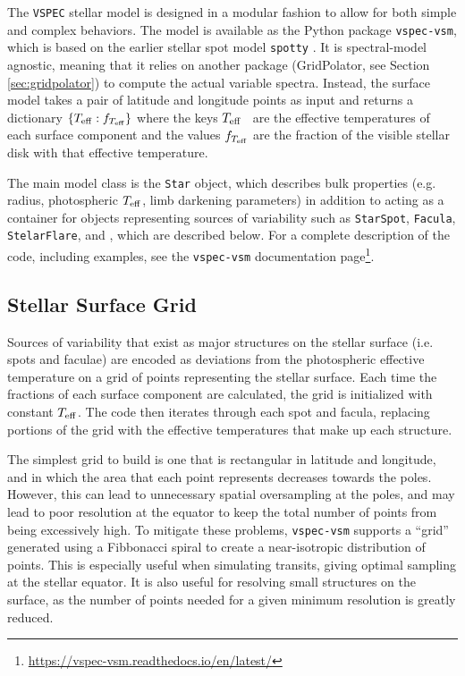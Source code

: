 \documentclass[linenumbers,5p,twocolumn,authoryear]{elsarticle}
\newcommand{\teff}{$T_{\rm eff}$}
\newcommand{\vspec}[1]{\texttt{VSPEC}#1}
\newcommand{\urldocsvspecvsm}{\url{https://vspec-vsm.readthedocs.io/en/latest/}}
\begin{document}
The \vspec{} stellar model is designed in a modular fashion to allow for both simple and complex behaviors. The model is available as the Python package \texttt{vspec-vsm}, which is based on the earlier stellar spot model \texttt{spotty} \citep{barclay2021}. It is spectral-model agnostic, meaning that it relies on another package (GridPolator, see Section \ref{sec:gridpolator}) to compute the actual variable spectra. Instead, the surface model takes a pair of latitude and longitude points as input and returns a dictionary $\{ T_{\rm eff} : f_{T_{\rm eff}} \}$ where the keys \teff~ are the effective temperatures of each surface component and the values $f_{T_{\rm eff}}$ are the fraction of the visible stellar disk with that effective temperature.

The main model class is the \texttt{Star} object, which describes bulk properties (e.g. radius, photospheric \teff, limb darkening parameters) in addition to acting as 
a container for objects representing sources of variability such as \texttt{StarSpot}, \texttt{Facula}, \texttt{StelarFlare}, and , which are described below. For a complete description of the code, including examples, see the \texttt{vspec-vsm} documentation page\footnote{\urldocsvspecvsm}.

\subsection{Stellar Surface Grid}
Sources of variability that exist as major structures on the stellar surface (i.e. spots and faculae) are encoded as deviations from the photospheric effective temperature on a grid of points representing the stellar surface. Each time the fractions of each surface component are calculated, the grid is initialized with constant \teff. The code then iterates through each spot and facula, replacing portions of the grid with the effective temperatures that make up each structure.

The simplest grid to build is one that is rectangular in latitude and longitude, and in which the area that each point represents decreases towards the poles. However, this can lead to unnecessary spatial oversampling at the poles, and may lead to poor resolution at the equator to keep the total number of points from being excessively high. To mitigate these problems, \texttt{vspec-vsm} supports a ``grid'' generated using a Fibbonacci spiral to create a near-isotropic distribution of points. This is especially useful when simulating transits, giving optimal sampling at the stellar equator. It is also useful for resolving small structures on the surface, as the number of points needed for a given minimum resolution is greatly reduced.
\end{document}
